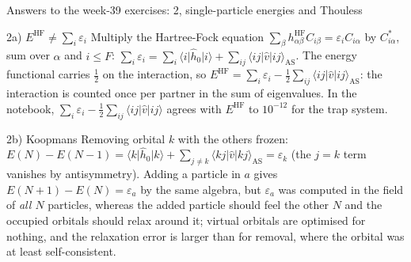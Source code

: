 \documentclass[aspectratio=169,10pt]{beamer}
\newcommand{\element}[3]{\langle #1\vert #2\vert #3\rangle}
\begin{document}
\begin{frame}{Answers to the week-39 exercises: 2, single-particle energies and Thouless}
  \footnotesize
  \begin{block}{2a) $E^{\mathrm{HF}}\ne\sum_i\varepsilon_i$}
    Multiply the Hartree-Fock equation $\sum_\beta h^{\mathrm{HF}}_{\alpha\beta}C_{i\beta}=\varepsilon_iC_{i\alpha}$ by $C_{i\alpha}^{*}$, sum over $\alpha$ and $i\le F$: $\sum_i\varepsilon_i=\sum_i\element{i}{\hat h_0}{i}+\sum_{ij}\element{ij}{\hat v}{ij}_{\mathrm{AS}}$. The energy functional carries $\frac12$ on the interaction, so $E^{\mathrm{HF}}=\sum_i\varepsilon_i-\frac12\sum_{ij}\element{ij}{\hat v}{ij}_{\mathrm{AS}}$: the interaction is counted once per partner in the sum of eigenvalues. In the notebook, $\sum_i\varepsilon_i-\frac12\sum_{ij}\element{ij}{\hat v}{ij}$ agrees with $E^{\mathrm{HF}}$ to $10^{-12}$ for the trap system.
  \end{block}
  \begin{block}{2b) Koopmans}
    Removing orbital $k$ with the others frozen: $E(N)-E(N-1)=\element{k}{\hat h_0}{k}+\sum_{j\ne k}\element{kj}{\hat v}{kj}_{\mathrm{AS}}=\varepsilon_k$ (the $j=k$ term vanishes by antisymmetry). Adding a particle in $a$ gives $E(N+1)-E(N)=\varepsilon_a$ by the same algebra, but $\varepsilon_a$ was computed in the field of \emph{all $N$} particles, whereas the added particle should feel the other $N$ and the occupied orbitals should relax around it; virtual orbitals are optimised for nothing, and the relaxation error is larger than for removal, where the orbital was at least self-consistent.
  \end{block}
\end{frame}
\end{document}
